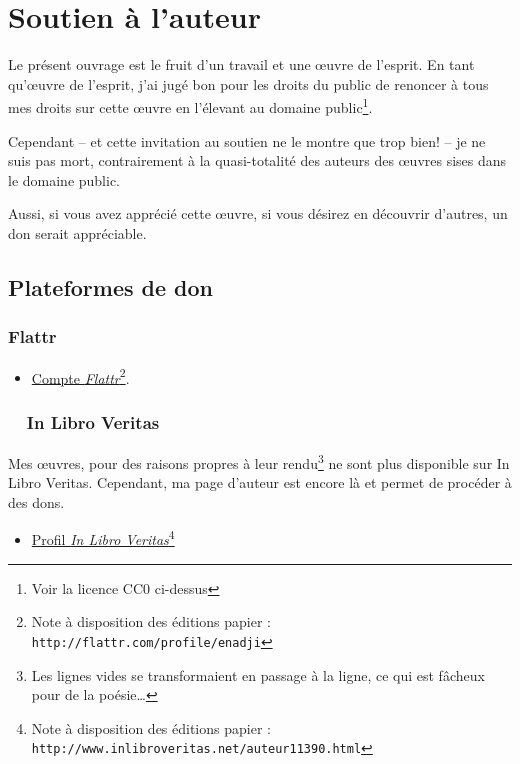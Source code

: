 
\section*{Soutien à l’auteur}

Le présent  ouvrage est  le fruit  d’un travail  et une  œuvre de
l’esprit.  En  tant qu’œuvre  de  l’esprit,  j’ai jugé  bon
pour  les droits  du  public  de renoncer à tous  mes  droits  sur cette  œuvre
en  l’élevant  au  domaine  public\footnote{Voir  la  licence  CC0
ci-dessus}.

Cependant -- et  cette invitation au soutien ne le  montre que trop bien! --  je ne suis
pas mort, contrairement à la quasi-totalité des auteurs des œuvres
sises dans le domaine public.

Aussi,  si vous  avez apprécié  cette œuvre,  si vous  désirez en
découvrir d’autres, un don serait appréciable.

\subsection*{Plateformes de don}

  \subsubsection*{Flattr}
    \begin{itemize}
      \item \href{http://flattr.com/profile/enadji}{Compte \emph{Flattr}}\footnote{Note à disposition des éditions papier : \texttt{http://flattr.com/profile/enadji}}.
    \end{itemize}
  \subsubsection*{~~In Libro Veritas}
    Mes œuvres, pour des raisons propres à leur rendu\footnote{Les lignes vides se transformaient en passage à la ligne, ce qui est fâcheux pour de la poésie…}
    ne sont plus disponible sur  In Libro Veritas. Cependant, ma page
    d’auteur est encore là et permet de procéder à des dons.
    \begin{itemize}
      \item \href{http://www.inlibroveritas.net/auteur11390.html}{Profil \emph{In Libro Veritas}}\footnote{Note à disposition des éditions papier : \texttt{http://www.inlibroveritas.net/auteur11390.html}}
    \end{itemize}

